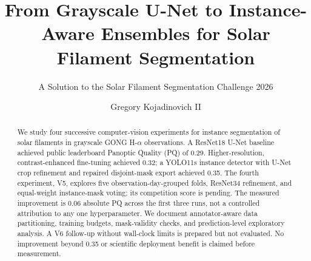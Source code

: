 \documentclass[sigconf]{acmart}
\begin{document}
\title{From Grayscale U-Net to Instance-Aware Ensembles for Solar Filament Segmentation}
\subtitle{A Solution to the Solar Filament Segmentation Challenge 2026} %


\author{Gregory Kojadinovich II}


\begin{abstract}
    We study four successive computer-vision experiments for instance segmentation of solar filaments in grayscale GONG H-$\alpha$ observations. A ResNet18 U-Net baseline achieved public leaderboard Panoptic Quality (PQ) of 0.29. Higher-resolution, contrast-enhanced fine-tuning achieved 0.32; a YOLO11s instance detector with U-Net crop refinement and repaired disjoint-mask export achieved 0.35. The fourth experiment, V5, explores five observation-day-grouped folds, ResNet34 refinement, and equal-weight instance-mask voting; its competition score is pending. The measured improvement is 0.06 absolute PQ across the first three runs, not a controlled attribution to any one hyperparameter. We document annotator-aware data partitioning, training budgets, mask-validity checks, and prediction-level exploratory analysis. A V6 follow-up without wall-clock limits is prepared but not evaluated. No improvement beyond 0.35 or scientific deployment benefit is claimed before measurement.
\end{abstract}

\maketitle

\ifguideStyle
{}
\par\medskip
\fi
\end{document}
